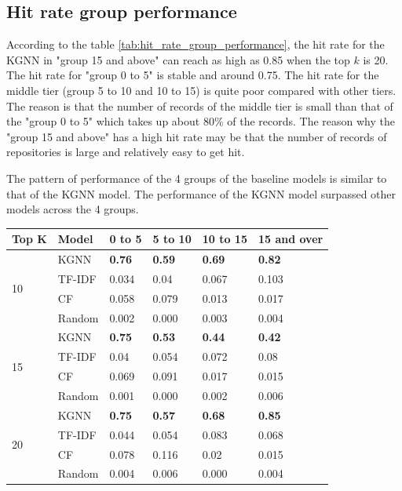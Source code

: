 \documentclass[11pt,twoside]{report}
\begin{document}
\subsection{Hit rate group performance}
According to the table \ref{tab:hit_rate_group_performance}, the hit rate for the KGNN in "group 15 and above" can reach as high as 0.85 when the top $k$ is 20. The hit rate for "group 0 to 5" is stable and around 0.75. The hit rate for the middle tier (group 5 to 10 and 10 to 15) is quite poor compared with other tiers. The reason is that the number of records of the middle tier is small than that of the "group 0 to 5" which takes up about 80\% of the records. The reason why the "group 15 and above" has a high hit rate may be that the number of records of repositories is large and relatively easy to get hit.

The pattern of performance of the 4 groups of the baseline models is similar to that of the KGNN model. The performance of the KGNN model surpassed other models across the 4 groups.

\begin{center}
    \begin{tabular}{l | l | l | l | l | l}
    \hline
    Top K & Model & 0 to 5 & 5 to 10 & 10 to 15 & 15 and over \\
    \hline
    \multirow{4}{*}{10} 
    & KGNN & \textbf{0.76} & \textbf{0.59} & \textbf{0.69} & \textbf{0.82} \\
    & TF-IDF & 0.034 & 0.04 & 0.067 & 0.103 \\
    & CF & 0.058 & 0.079 & 0.013 & 0.017 \\
    & Random & 0.002 & 0.000 & 0.003 & 0.004 \\
    \hline
    \multirow{4}{*}{15}
    & KGNN & \textbf{0.75} & \textbf{0.53} & \textbf{0.44} & \textbf{0.42} \\
    & TF-IDF & 0.04 & 0.054 & 0.072 & 0.08 \\
    & CF & 0.069 & 0.091 & 0.017 & 0.015 \\
    & Random & 0.001 & 0.000 & 0.002 & 0.006 \\
    \hline
    \multirow{4}{*}{20}
    & KGNN & \textbf{0.75} & \textbf{0.57} & \textbf{0.68} & \textbf{0.85} \\
    & TF-IDF & 0.044 & 0.054 & 0.083 & 0.068 \\
    & CF & 0.078 & 0.116 & 0.02 & 0.015 \\
    & Random & 0.004 & 0.006 & 0.000 & 0.004 \\
    \end{tabular}
    \label{tab:hit_rate_group_performance}
\end{center}
\end{document}
